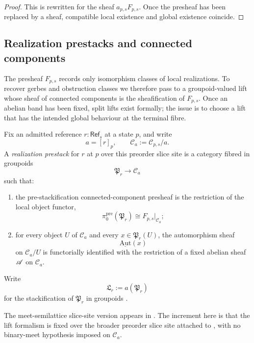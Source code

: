 \begin{proof}
This is  rewritten for the sheaf $a_{p,s}F_{p,s}$. Once the presheaf has been replaced by a sheaf, compatible local existence and global existence coincide.
\end{proof}

\subsection{Realization prestacks and connected components}

The presheaf $F_{p,s}$ records only isomorphism classes of local realizations. To recover gerbes and obstruction classes we therefore pass to a groupoid-valued lift whose sheaf of connected components is the sheafification of $F_{p,s}$. Once an abelian band has been fixed, split lifts exist formally; the issue is to choose a lift that has the intended global behaviour at the terminal fibre.

\begin{definition}\label{def:realization-prestack}
Fix an admitted reference $r:\mathsf{Ref}_s$ at a state $p$, and write
\[
a=[r]_p,
\qquad
\mathcal C_a:=\mathcal C_{p,s}/a.
\]
A \emph{realization prestack} for $r$ at $p$ over this preorder slice site is a category fibred in groupoids
\[
\mathfrak P_r\to \mathcal C_a
\]
such that:
\begin{enumerate}[label=(\roman*),nosep]
\item the pre-stackification connected-component presheaf is the restriction of the local object functor,
\[
\pi_0^{\mathrm{pre}}(\mathfrak P_r)\cong F_{p,s}|_{\mathcal C_a};
\]
\item for every object $U$ of $\mathcal C_a$ and every $x\in \mathfrak P_r(U)$, the automorphism sheaf
\[
\underline{\mathrm{Aut}}(x)
\]
on $\mathcal C_a/U$ is functorially identified with the restriction of a fixed abelian sheaf $\mathscr{A}$ on $\mathcal C_a$.
\end{enumerate}
Write
\[
\mathfrak L_r:=a(\mathfrak P_r)
\]
for the stackification of $\mathfrak P_r$ in groupoids \cite[Tag~02ZP]{StacksProject}.
\end{definition}

\begin{remark}
The meet-semilattice slice-site version appears in \cite[Definition~4.10]{MaZhang2026ConditionalGluingFailure}. The increment here is that the lift formalism is fixed over the broader preorder slice site attached to , with no binary-meet hypothesis imposed on $\mathcal C_a$.
\end{remark}

